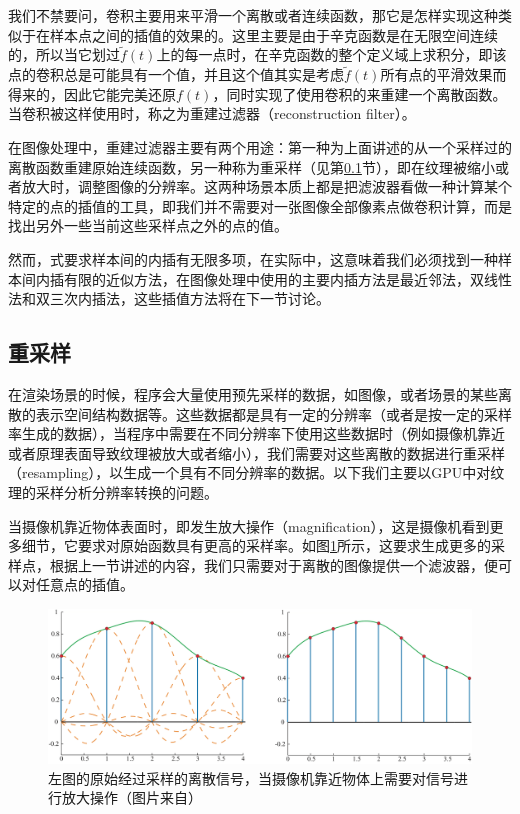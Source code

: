 我们不禁要问，卷积主要用来平滑一个离散或者连续函数，那它是怎样实现这种类似于在样本点之间的插值的效果的。这里主要是由于辛克函数是在无限空间连续的，所以当它划过$\tilde{f}(t)$上的每一点时，在辛克函数的整个定义域上求积分，即该点的卷积总是可能具有一个值，并且这个值其实是考虑$\tilde{f}(t)$所有点的平滑效果而得来的，因此它能完美还原$f(t)$，同时实现了使用卷积的来重建一个离散函数。当卷积被这样使用时，称之为重建过滤器（reconstruction filter）。

在图像处理中，重建过滤器主要有两个用途：第一种为上面讲述的从一个采样过的离散函数重建原始连续函数，另一种称为重采样（见第\ref{sec:intro-resampling}节），即在纹理被缩小或者放大时，调整图像的分辨率。这两种场景本质上都是把滤波器看做一种计算某个特定的点的插值的工具，即我们并不需要对一张图像全部像素点做卷积计算，而是找出另外一些当前这些采样点之外的点的值。

然而，式要求样本间的内插有无限多项，在实际中，这意味着我们必须找到一种样本间内插有限的近似方法，在图像处理中使用的主要内插方法是最近邻法，双线性法和双三次内插法，这些插值方法将在下一节讨论。





\subsection{重采样}\label{sec:intro-resampling}
在渲染场景的时候，程序会大量使用预先采样的数据，如图像，或者场景的某些离散的表示空间结构数据等。这些数据都是具有一定的分辨率（或者是按一定的采样率生成的数据），当程序中需要在不同分辨率下使用这些数据时（例如摄像机靠近或者原理表面导致纹理被放大或者缩小），我们需要对这些离散的数据进行重采样（resampling），以生成一个具有不同分辨率的数据。以下我们主要以GPU中对纹理的采样分析分辨率转换的问题。

当摄像机靠近物体表面时，即发生放大操作（magnification），这是摄像机看到更多细节，它要求对原始函数具有更高的采样率。如图\ref{f:intro-magnification}所示，这要求生成更多的采样点，根据上一节讲述的内容，我们只需要对于离散的图像提供一个滤波器，便可以对任意点的插值。

\begin{figure}
	\includegraphics[width=1.\textwidth]{figures/intro/magnification}
	\caption{左图的原始经过采样的离散信号，当摄像机靠近物体上需要对信号进行放大操作（图片来自\cite{b:rtr}）}
	\label{f:intro-magnification}
\end{figure}

